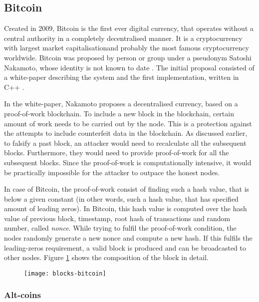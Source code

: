 \subsection{Bitcoin}
% 
Created in 2009, Bitcoin is the first ever digital currency, that operates without a central authority in a completely decentralised manner. It is a cryptocurrency with largest market capitalisation\footnotemark and probably the most famous cryptocurrency worldwide.
% 
% 
Bitcoin was proposed by person or group under a pseudonym Satoshi Nakamoto, whose identity is not known to date \cite{Feins2017SatoshiBitcoin}. The initial proposal consisted of a white-paper describing the system \cite{NakamotoBitcoin:System} and the first implementation, written in  C++ \footnotemark.
% 

In the white-paper, Nakamoto proposes a decentralised currency, based on a proof-of-work blockchain. To include a new block in the blockchain, certain amount of work needs to be carried out by the node. This is a protection against the attempts to include counterfeit data in the blockchain. As discussed earlier, to falsify a past block, an attacker would need to recalculate all the subsequent blocks. Furthermore, they would need to provide proof-of-work for all the subsequent blocks. Since the proof-of-work is computationally intensive, it would be practically impossible for the attacker to outpace the honest nodes.

In case of Bitcoin, the proof-of-work consist of finding such a hash value, that is below a given constant (in other words, such a hash value, that has specified amount of leading zeros). In Bitcoin, this hash value is computed over the hash value of previous block, timestamp\footnotemark, root hash of transactions and random number, called \textit{nonce}. While trying to fulfil the proof-of-work condition, the nodes randomly generate a new nonce and compute a new hash. If this fulfils the leading-zeros requirement, a valid block is produced and can be broadcasted to other nodes. Figure \ref{fig:blocks-bitcoin} shows the composition of the block in detail.
% 
% 
\begin{figure}[ht]
    \centering
    \texttt{[image: blocks-bitcoin]}
    \caption{}
    \label{fig:blocks-bitcoin}
\end{figure}

\subsubsection{Alt-coins}

